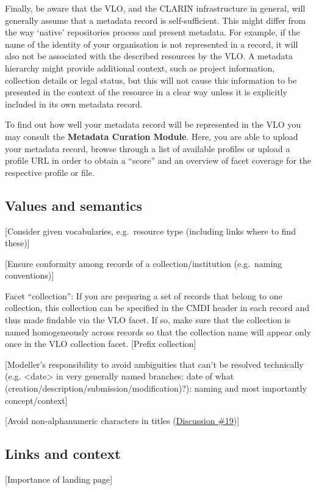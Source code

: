 \begin{workinprogress}
Finally, be aware that the VLO, and the CLARIN infrastructure in general, will generally assume that a metadata record is
self-sufficient. This might differ from the way `native' repositories process and present metadata. For example, if the name of the identity of your organisation is not represented in a record, it will also not be associated with the described resources by the VLO. A metadata hierarchy might provide additional context, such as project information, collection details or legal status, but this will not cause this information to be presented in the context of the resource in a clear way unless it is explicitly included in its own metadata record.

To find out how well your metadata record will be represented in the VLO you may consult the \textbf{Metadata Curation Module}.
Here, you are able to upload your metadata record, browse through a list of available profiles or upload a profile URL in order to obtain a ``score'' and an overview of facet coverage for the respective profile or file.

\subsection{Values and semantics}\label{values-and-semantics}

[Consider given vocabularies, e.g.~resource type (including links where to find these)]

[Ensure conformity among records of a collection/institution
(e.g.~naming conventions)]

Facet ``collection'': If you are preparing a set of records that belong to one collection, this collection can be specified in the CMDI header in each record and thus made findable via the VLO facet. If so, make sure that the collection is named homogeneously across records so that the collection name will appear only once in the VLO collection facet. [Prefix collection]

[Modeller's responsibility to avoid ambiguities that can't be resolved technically (e.g. \textless{}date\textgreater{} in very generally named branches: date of what (creation/description/submission/modification)?): naming and most importantly concept/context]

[Avoid non-alphanumeric characters in titles
(\href{https://www.gitbook.com/book/cmdi-taskforce/cmdi-best-practices/discussions/19}{Discussion
\#19})]

\subsection{Links and context}\label{links-and-context}

[Importance of landing page]

\end{workinprogress}
